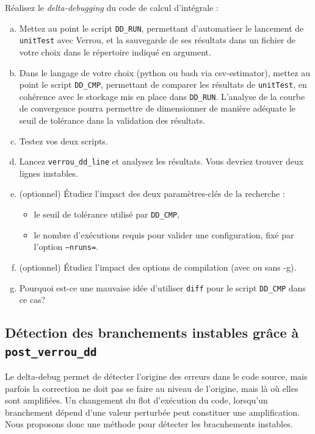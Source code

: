 \documentclass[a4paper]{article}
\newcounter{Question}
\newenvironment{question}[1][\unskip]{
  \bigskip
  \stepcounter{Question}
  \def\questionTitle{ #1}
  \begin{mdframed}[style=question]
  }{
  \end{mdframed}
}
\begin{document}
\begin{question} Réalisez le \textit{delta-debugging} du code de calcul
  d'intégrale :
  \begin{enumerate}[(a)]
  \item Mettez au point le script \texttt{DD\_RUN}, permettant d'automatiser le
    lancement de \texttt{unitTest} avec Verrou, et la sauvegarde de ses
    résultats dans un fichier de votre choix dans le répertoire indiqué en
    argument.
  \item Dans le langage de votre choix (python ou bash via csv-estimator),
    mettez au point le script \texttt{DD\_CMP}, permettant de comparer les
    résultats de \texttt{unitTest}, en cohérence avec le stockage mis en place
    dans \texttt{DD\_RUN}. L'analyse de la courbe de convergence pourra permettre
    de dimensionner de manière adéquate le seuil de tolérance dans la validation
    des résultats.
  \item Testez vos deux scripts.
  \item Lancez \texttt{verrou\_dd\_line} et analysez les résultats. Vous devriez
    trouver deux lignes instables.
  \item (optionnel) Étudiez l'impact des deux paramètres-clés de la recherche :
    \begin{itemize}
    \item le seuil de tolérance utilisé par \texttt{DD\_CMP},
    \item le nombre d'exécutions requis pour valider une configuration, fixé par
       l'option \texttt{--nruns=}.
    \end{itemize}
  \item (optionnel) Étudiez l'impact des options de compilation (avec ou sans -g).
  \item Pourquoi est-ce une mauvaise idée d'utiliser \texttt{diff} pour le script
    \texttt{DD\_CMP} dans ce cas?
  \end{enumerate}
\end{question}

\subsection{Détection des branchements instables grâce à \texttt{post\_verrou\_dd}}
Le delta-debug permet de détecter l'origine des erreurs dans le code
source, mais parfois la correction ne doit pas se faire au niveau de
l'origine, mais là où elles sont amplifiées.
Un changement du flot d'exécution du code,
lorsqu'un branchement dépend d'une valeur perturbée peut constituer
une amplification. Nous proposons donc une méthode pour détecter les
bracnhements instables.
\end{document}
